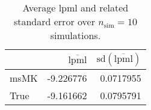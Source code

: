 \begin{table}[H]

\caption{Average lpml and related standard error over $n_{\text{sim}} = 10$ simulations.}
\centering
\begin{tabular}[t]{lrr}
\toprule
  & $\overbar{\text{lpml}}$ & $\text{sd}(\overbar{\text{lpml}})$\\
\midrule
msMK & -9.226776 & 0.0717955\\
True & -9.161662 & 0.0795791\\
\bottomrule
\end{tabular}
\end{table}